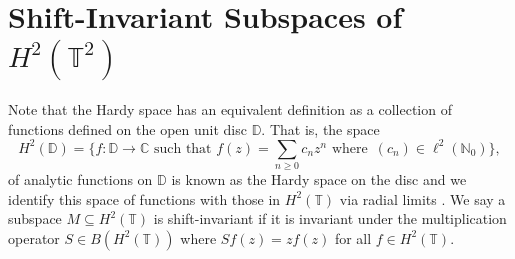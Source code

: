 \documentclass[12pt,reqno]{amsart}
\theoremstyle{definition}
\theoremstyle{definition}
\numberwithin{equation}{section}
\begin{document}

\section{Shift-Invariant Subspaces of $H^2(\mathbb{T}^2)$}
Note that the Hardy space has an equivalent definition as a collection of functions defined on the open unit disc $\mathbb{D}$. That is, the space \begin{displaymath}
    H^2(\mathbb{D}) = \{ f: \mathbb{D} \to \mathbb{C} \, \, \text{such that} \, \, f(z) = \underset{n \geq 0}{\sum} c_{n}z^n \, \, \text{where} \, \, \, (c_{n}) \in \ell^2(\mathbb{N}_0)\},
\end{displaymath} 
of analytic functions on $\mathbb{D}$ is known as the Hardy space on the disc and we identify this space of functions with those in $H^2(\mathbb{T})$ via radial limits \cite{MR07}. 
We say a subspace $M \subseteq H^2(\mathbb{T})$  is shift-invariant if it is invariant under the multiplication operator $S \in B(H^2(\mathbb{T}))$ where $Sf(z) = zf(z)$ for all $f \in H^2(\mathbb{T})$.
\end{document}
